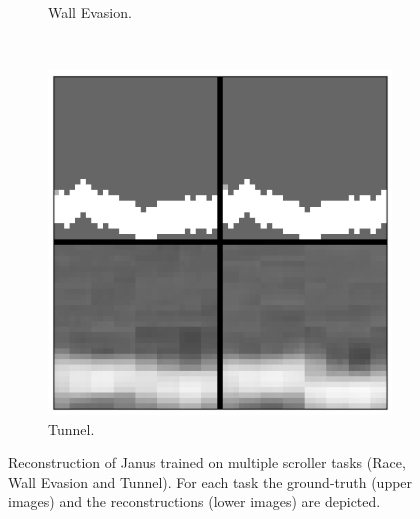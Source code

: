 \begin{figure}[t!]
\begin{subfigure}{0.3\columnwidth}
		\caption{Wall Evasion.}
		\label{subfig:janus_scroll_walls}
	\end{subfigure}%
	~ 
	\begin{subfigure}{0.3\columnwidth}
		\centering
		\includegraphics[width=\linewidth]{documentation/report/img/janus_scroll_tunnel.png}
		\caption{Tunnel.}
		\label{subfig:janus_scroll_tunnel}
	\end{subfigure}

	\caption{Reconstruction of Janus trained on multiple scroller tasks (Race, Wall Evasion and Tunnel). For each task the ground-truth (upper images) and the reconstructions (lower images) are depicted.}
	\label{fig:janus_multitask}
\end{figure}


